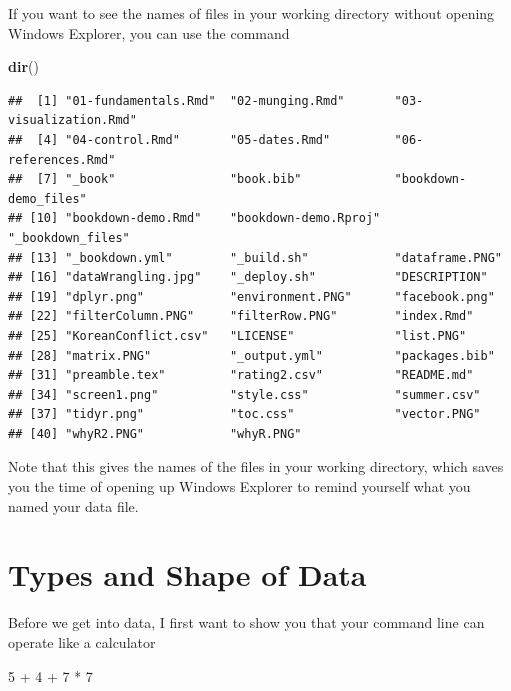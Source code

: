 \documentclass[]{book}
\newenvironment{Shaded}{\begin{snugshade}}{\end{snugshade}}
\newcommand{\KeywordTok}[1]{\textcolor[rgb]{0.13,0.29,0.53}{\textbf{{#1}}}}
\newcommand{\DecValTok}[1]{\textcolor[rgb]{0.00,0.00,0.81}{{#1}}}
\newcommand{\StringTok}[1]{\textcolor[rgb]{0.31,0.60,0.02}{{#1}}}
\newcommand{\NormalTok}[1]{{#1}}
\begin{document}
If you want to see the names of files in your working directory without
opening Windows Explorer, you can use the command

\begin{Shaded}
\begin{Highlighting}[]
\KeywordTok{dir}\NormalTok{()}
\end{Highlighting}
\end{Shaded}

\begin{verbatim}
##  [1] "01-fundamentals.Rmd"  "02-munging.Rmd"       "03-visualization.Rmd"
##  [4] "04-control.Rmd"       "05-dates.Rmd"         "06-references.Rmd"   
##  [7] "_book"                "book.bib"             "bookdown-demo_files" 
## [10] "bookdown-demo.Rmd"    "bookdown-demo.Rproj"  "_bookdown_files"     
## [13] "_bookdown.yml"        "_build.sh"            "dataframe.PNG"       
## [16] "dataWrangling.jpg"    "_deploy.sh"           "DESCRIPTION"         
## [19] "dplyr.png"            "environment.PNG"      "facebook.png"        
## [22] "filterColumn.PNG"     "filterRow.PNG"        "index.Rmd"           
## [25] "KoreanConflict.csv"   "LICENSE"              "list.PNG"            
## [28] "matrix.PNG"           "_output.yml"          "packages.bib"        
## [31] "preamble.tex"         "rating2.csv"          "README.md"           
## [34] "screen1.png"          "style.css"            "summer.csv"          
## [37] "tidyr.png"            "toc.css"              "vector.PNG"          
## [40] "whyR2.PNG"            "whyR.PNG"
\end{verbatim}

Note that this gives the names of the files in your working directory,
which saves you the time of opening up Windows Explorer to remind
yourself what you named your data file.

\section{Types and Shape of Data}\label{types-and-shape-of-data}

Before we get into data, I first want to show you that your command line
can operate like a calculator

\begin{Shaded}
\begin{Highlighting}[]
\DecValTok{5} \NormalTok{+}\StringTok{ }\DecValTok{4} \NormalTok{+}\StringTok{ }\DecValTok{7} \NormalTok{*}\StringTok{ }\DecValTok{7}
\end{Highlighting}
\end{Shaded}
\end{document}
